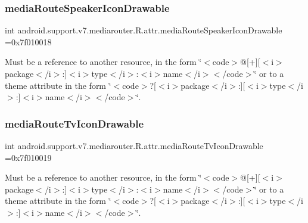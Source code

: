 \subsubsection{\texorpdfstring{media\+Route\+Speaker\+Icon\+Drawable}{mediaRouteSpeakerIconDrawable}}
{\footnotesize\ttfamily int android.\+support.\+v7.\+mediarouter.\+R.\+attr.\+media\+Route\+Speaker\+Icon\+Drawable =0x7f010018\hspace{0.3cm}{\ttfamily [static]}}

Must be a reference to another resource, in the form \char`\"{}$<$code$>$@\mbox{[}+\mbox{]}\mbox{[}$<$i$>$package$<$/i$>$\+:\mbox{]}$<$i$>$type$<$/i$>$\+:$<$i$>$name$<$/i$>$$<$/code$>$\char`\"{} or to a theme attribute in the form \char`\"{}$<$code$>$?\mbox{[}$<$i$>$package$<$/i$>$\+:\mbox{]}\mbox{[}$<$i$>$type$<$/i$>$\+:\mbox{]}$<$i$>$name$<$/i$>$$<$/code$>$\char`\"{}. \mbox{\label{classandroid_1_1support_1_1v7_1_1mediarouter_1_1R_1_1attr_a5b8b523fed90b8bae28af7246b02ef8a}} 
\subsubsection{\texorpdfstring{media\+Route\+Tv\+Icon\+Drawable}{mediaRouteTvIconDrawable}}
{\footnotesize\ttfamily int android.\+support.\+v7.\+mediarouter.\+R.\+attr.\+media\+Route\+Tv\+Icon\+Drawable =0x7f010019\hspace{0.3cm}{\ttfamily [static]}}

Must be a reference to another resource, in the form \char`\"{}$<$code$>$@\mbox{[}+\mbox{]}\mbox{[}$<$i$>$package$<$/i$>$\+:\mbox{]}$<$i$>$type$<$/i$>$\+:$<$i$>$name$<$/i$>$$<$/code$>$\char`\"{} or to a theme attribute in the form \char`\"{}$<$code$>$?\mbox{[}$<$i$>$package$<$/i$>$\+:\mbox{]}\mbox{[}$<$i$>$type$<$/i$>$\+:\mbox{]}$<$i$>$name$<$/i$>$$<$/code$>$\char`\"{}. \mbox{\label{classandroid_1_1support_1_1v7_1_1mediarouter_1_1R_1_1attr_af562bc4c0c7889d849b35009c24ff701}} 
